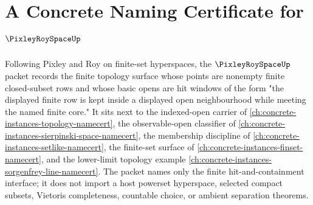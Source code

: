 \chapter{A Concrete Naming Certificate for $\PixleyRoySpaceUp$}
\label{ch:concrete-instances-pixley-roy-space-namecert}

Following Pixley and Roy on finite-set hyperspaces, the $\PixleyRoySpaceUp$ packet records the finite topology surface whose points are nonempty finite closed-subset rows and whose basic opens are hit windows of the form "the displayed finite row is kept inside a displayed open neighbourhood while meeting the named finite core." It sits next to the indexed-open carrier of \autoref{ch:concrete-instances-topology-namecert}, the observable-open classifier of \autoref{ch:concrete-instances-sierpinski-space-namecert}, the membership discipline of \autoref{ch:concrete-instances-setlike-namecert}, the finite-set surface of \autoref{ch:concrete-instances-finset-namecert}, and the lower-limit topology example \autoref{ch:concrete-instances-sorgenfrey-line-namecert}. The packet names only the finite hit-and-containment interface; it does not import a host powerset hyperspace, selected compact subsets, Vietoris completeness, countable choice, or ambient separation theorems.

